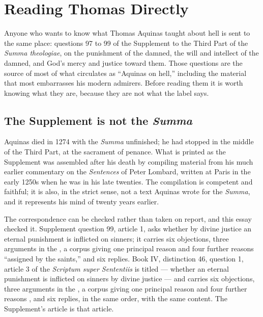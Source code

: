 \section{Reading Thomas Directly}

Anyone who wants to know what Thomas Aquinas taught about hell is sent to the same place: questions 97 to 99 of the Supplement to the Third Part of the \emph{Summa theologiae}, on the punishment of the damned, the will and intellect of the damned, and God's mercy and justice toward them. Those questions are the source of most of what circulates as ``Aquinas on hell,'' including the material that most embarrasses his modern admirers. Before reading them it is worth knowing what they are, because they are not what the label says.

\subsection{The Supplement is not the \emph{Summa}}

Aquinas died in 1274 with the \emph{Summa} unfinished; he had stopped in the middle of the Third Part, at the sacrament of penance. What is printed as the Supplement was assembled after his death by compiling material from his much earlier commentary on the \emph{Sentences} of Peter Lombard, written at Paris in the early 1250s when he was in his late twenties. The compilation is competent and faithful; it is also, in the strict sense, not a text Aquinas wrote for the \emph{Summa}, and it represents his mind of twenty years earlier.

The correspondence can be checked rather than taken on report, and this essay checked it. Supplement question 99, article 1, asks whether by divine justice an eternal punishment is inflicted on sinners; it carries six objections, three arguments in the , a corpus giving one principal reason and four further reasons ``assigned by the saints,'' and six replies. Book IV, distinction 46, question 1, article 3 of the \emph{Scriptum super Sententiis} is titled  --- whether an eternal punishment is inflicted on sinners by divine justice --- and carries six objections, three arguments in the , a corpus giving one principal reason and four further reasons , and six replies, in the same order, with the same content. The Supplement's article is that article.

